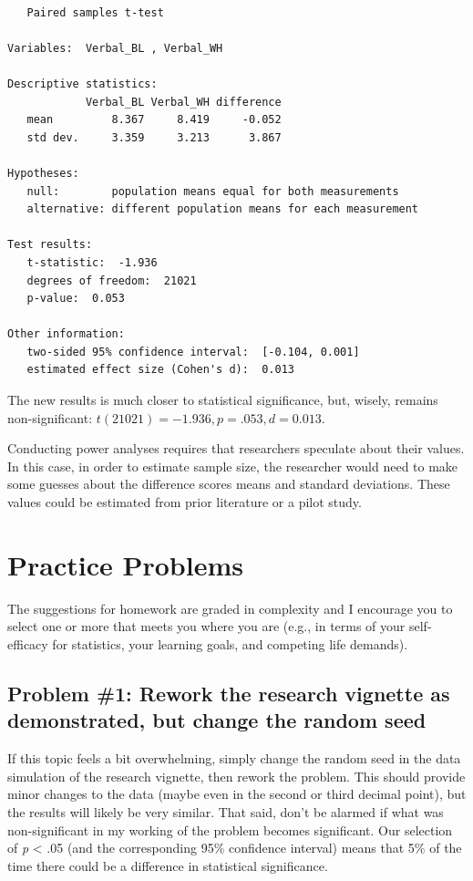 \documentclass[
  11pt,
]{book}
\begin{document}
\begin{verbatim}

   Paired samples t-test 

Variables:  Verbal_BL , Verbal_WH 

Descriptive statistics: 
            Verbal_BL Verbal_WH difference
   mean         8.367     8.419     -0.052
   std dev.     3.359     3.213      3.867

Hypotheses: 
   null:        population means equal for both measurements
   alternative: different population means for each measurement

Test results: 
   t-statistic:  -1.936 
   degrees of freedom:  21021 
   p-value:  0.053 

Other information: 
   two-sided 95% confidence interval:  [-0.104, 0.001] 
   estimated effect size (Cohen's d):  0.013 
\end{verbatim}

The new results is much closer to statistical significance, but, wisely, remains non-significant: \(t(21021) = -1.936, p = .053, d = 0.013\).

Conducting power analyses requires that researchers speculate about their values. In this case, in order to estimate sample size, the researcher would need to make some guesses about the difference scores means and standard deviations. These values could be estimated from prior literature or a pilot study.

\hypertarget{practice-problems-3}{%
\section{Practice Problems}\label{practice-problems-3}}

The suggestions for homework are graded in complexity and I encourage you to select one or more that meets you where you are (e.g., in terms of your self-efficacy for statistics, your learning goals, and competing life demands).

\hypertarget{problem-1-rework-the-research-vignette-as-demonstrated-but-change-the-random-seed-2}{%
\subsection{Problem \#1: Rework the research vignette as demonstrated, but change the random seed}\label{problem-1-rework-the-research-vignette-as-demonstrated-but-change-the-random-seed-2}}

If this topic feels a bit overwhelming, simply change the random seed in the data simulation of the research vignette, then rework the problem. This should provide minor changes to the data (maybe even in the second or third decimal point), but the results will likely be very similar. That said, don't be alarmed if what was non-significant in my working of the problem becomes significant. Our selection of \emph{p} \textless{} .05 (and the corresponding 95\% confidence interval) means that 5\% of the time there could be a difference in statistical significance.
\end{document}
